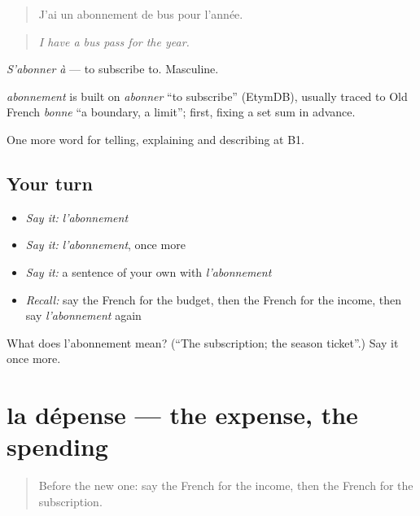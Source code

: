 \begin{quote}
J'ai un abonnement de bus pour l'année.
\end{quote}

\begin{quote}
\emph{I have a bus pass for the year.}
\end{quote}

\emph{S'abonner à} — to subscribe to. Masculine.

\begin{cousinweb}
\emph{abonnement} is built on \emph{abonner} \textquotedblleft{}to subscribe\textquotedblright{} (EtymDB), usually traced to Old French \emph{bonne} \textquotedblleft{}a boundary, a limit\textquotedblright{}; first, fixing a set sum in advance.
\end{cousinweb}

\begin{grammarlens}[title={What you've built}]
One more word for telling, explaining and describing at B1.
\end{grammarlens}

\subsection*{Your turn}
\begin{itemize}
\raggedright
  \item \emph{Say it:} \emph{l'abonnement}
  \item \emph{Say it:} \emph{l'abonnement}, once more
  \item \emph{Say it:} a sentence of your own with \emph{l'abonnement}
  \item \emph{Recall:} say the French for the budget, then the French for the income, then say \emph{l'abonnement} again
\end{itemize}

\begin{tcolorbox}[breakable,colback=teal!4,colframe=teal!35!black,title={Before you move on}]
What does l'abonnement mean? (\textquotedblleft{}The subscription; the season ticket\textquotedblright{}.) Say it once more.
\end{tcolorbox}
\section[la dépense]{la dépense — the expense, the spending}

\label{lesson:FR-C390-depense}



\begin{quote}
Before the new one: say the French for the income, then the French for the subscription.
\end{quote}


